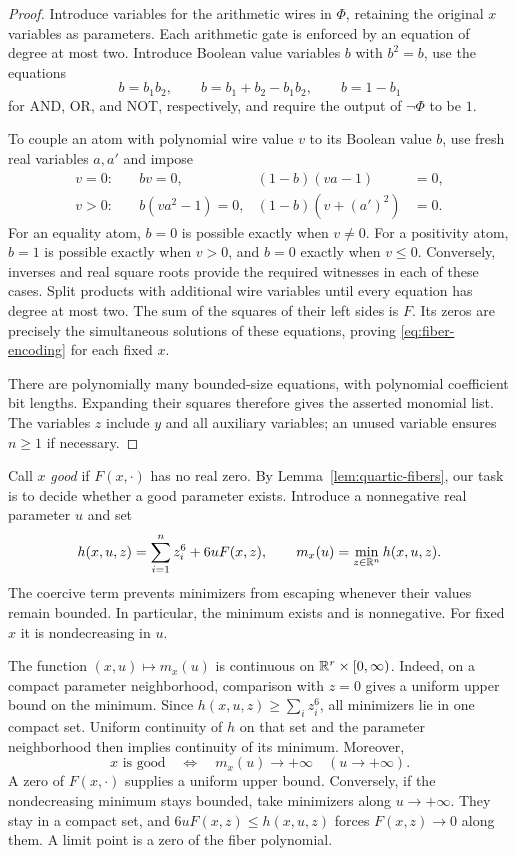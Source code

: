 \begin{proof}
Introduce variables for the arithmetic wires in $\Phi$, retaining the
original $x$ variables as parameters.  Each arithmetic gate is enforced
by an equation of degree at most two.  Introduce Boolean value variables
$b$ with $b^2=b$, use the equations
\[
 b=b_1b_2,\qquad b=b_1+b_2-b_1b_2,\qquad b=1-b_1
\]
for AND, OR, and NOT, respectively, and require the output of
$\neg\Phi$ to be $1$.

To couple an atom with polynomial wire value $v$ to its Boolean value
$b$, use fresh real variables $a,a'$ and impose
\begin{align*}
 v=0:\quad &bv=0, & (1-b)(va-1)&=0,\\
 v>0:\quad &b(va^2-1)=0, & (1-b)(v+(a')^2)&=0.
\end{align*}
For an equality atom, $b=0$ is possible exactly when $v\ne0$.
For a positivity atom, $b=1$ is possible exactly when $v>0$, and
$b=0$ exactly when $v\le0$.  Conversely, inverses and real square roots
provide the required witnesses in each of these cases.  Split products
with additional wire variables until every equation has degree at most
two.  The sum of the squares of their left sides is $F$.  Its zeros are
precisely the simultaneous solutions of these equations, proving
\eqref{eq:fiber-encoding} for each fixed $x$.

There are polynomially many bounded-size equations, with polynomial
coefficient bit lengths.  Expanding their squares therefore gives the
asserted monomial list.  The variables $z$ include $y$ and all auxiliary
variables; an unused variable ensures $n\ge1$ if necessary.
\end{proof}

Call $x$ \emph{good} if $F(x,\cdot)$ has no real zero.  By
Lemma~\ref{lem:quartic-fibers}, our task is to decide whether a good
parameter exists.  Introduce a nonnegative real parameter $u$ and set
\begin{equation}\label{eq:fiber-minimum}
 h(x,u,z)=\sum_{i=1}^n z_i^6+6uF(x,z),
 \qquad
 m_x(u)=\min_{z\in\mathbb R^n}h(x,u,z).
\end{equation}
The coercive term prevents minimizers from escaping whenever their
values remain bounded.  In particular, the minimum exists and is
nonnegative.  For fixed $x$ it is nondecreasing in $u$.

The function $(x,u)\mapsto m_x(u)$ is continuous on
$\mathbb R^r\times[0,\infty)$.  Indeed, on a compact parameter neighborhood,
comparison with $z=0$ gives a uniform upper bound on the minimum.
Since $h(x,u,z)\ge\sum_i z_i^6$, all minimizers lie in one compact set.
Uniform continuity of $h$ on that set and the parameter neighborhood
then implies continuity of its minimum.  Moreover,
\begin{equation}\label{eq:good-divergence}
 x\text{ is good}
 \quad\Longleftrightarrow\quad
 m_x(u)\longrightarrow+\infty\quad(u\longrightarrow+\infty).
\end{equation}
A zero of $F(x,\cdot)$ supplies a uniform upper bound.  Conversely, if
the nondecreasing minimum stays bounded, take minimizers along
$u\to+\infty$.  They stay in a compact set, and
$6uF(x,z)\le h(x,u,z)$ forces $F(x,z)\to0$ along them.
A limit point is a zero of the fiber polynomial.

